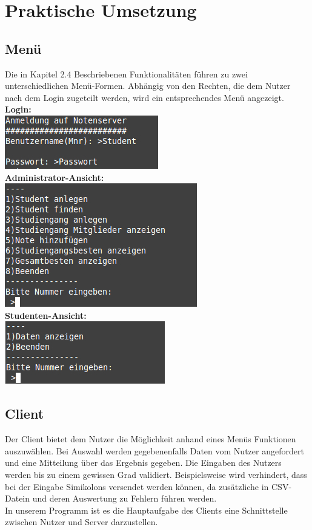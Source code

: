 \documentclass{scrartcl}
\begin{document}
\section{Praktische Umsetzung}
	\subsection{Menü}
		Die in Kapitel 2.4 Beschriebenen Funktionalitäten führen zu zwei unterschiedlichen Menü-Formen. Abhängig von den Rechten, die dem Nutzer nach dem Login zugeteilt werden, wird ein entsprechendes Menü angezeigt. \\
		
		\textbf{Login:}\\
		
		\includegraphics[scale=0.6]{Login.jpg}\\

		\textbf{Administrator-Ansicht:}\\

		\includegraphics[scale=0.6]{Admin.jpg}\\

		\textbf{Studenten-Ansicht:}\\

		\includegraphics[scale=0.6]{Student.jpg}\\
	\subsection{Client}
		Der Client bietet dem Nutzer die Möglichkeit anhand eines Menüs Funktionen auszuwählen. Bei Auswahl werden gegebenenfalls Daten vom Nutzer angefordert und eine Mitteilung über das Ergebnis gegeben. Die Eingaben des Nutzers werden bis zu einem gewissen Grad validiert. Beispielsweise wird verhindert, dass bei der Eingabe Simikolons versendet werden können, da zusätzliche in CSV-Datein und deren Auswertung zu Fehlern führen werden.\\
		In unserem Programm ist es die Hauptaufgabe des Clients eine Schnittstelle zwischen Nutzer und Server darzustellen.
\end{document}
